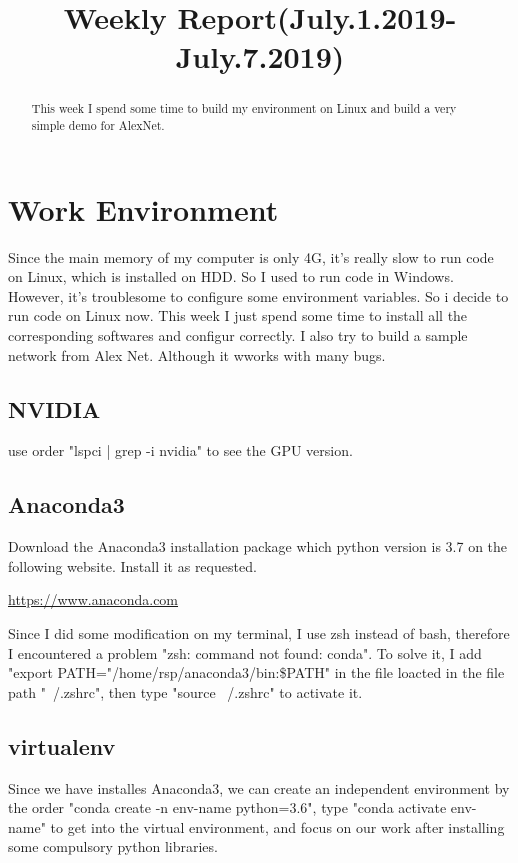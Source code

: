 \documentclass{article} %
\title{Weekly Report(July.1.2019-July.7.2019)}
\begin{document}
\maketitle

\begin{abstract}
This week I spend some time to build my environment on Linux and build a very simple demo for AlexNet.
\end{abstract}

\section{Work Environment}
Since the main memory of my computer is only 4G, it's really slow to run code on Linux, which is installed on HDD. So I used to run code in Windows. However, it's troublesome to configure some environment variables. So i decide to run code on Linux now. This week I just spend some time to install all the corresponding softwares and configur correctly. I also try to build a sample network from Alex Net. Although it wworks with many bugs.

\subsection{NVIDIA} 
use order "lspci | grep -i nvidia" to see the GPU version.

\subsection{Anaconda3} 
Download the Anaconda3 installation package which python version is 3.7 on the following website. Install it as requested.

\begin{center}
	\url{https://www.anaconda.com}
\end{center}

Since I did some modification on my terminal, I use zsh instead of bash, therefore I encountered a problem "zsh: command not found: conda". To solve it, I add "export PATH="/home/rsp/anaconda3/bin:\$PATH" in the file loacted in the file path "~/.zshrc", then type "source ~/.zshrc" to activate it.

\subsection{virtualenv}
Since we have installes Anaconda3, we can create an independent environment by the order "conda create -n env-name python=3.6", type "conda activate env-name" to get into the virtual environment, and focus on our work after installing some compulsory python libraries.
\end{document}
